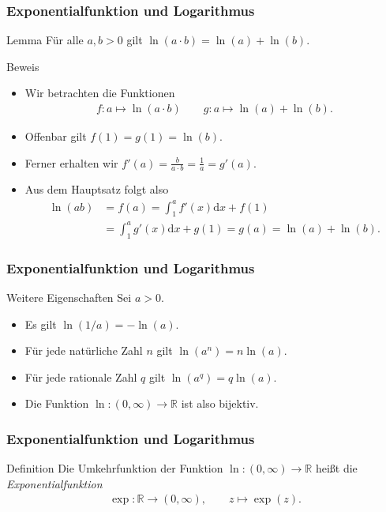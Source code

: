 \documentclass{beamer}
\renewcommand{\emph}[1]{{\textcolor{solarizedRed}{\itshape #1}}}
\newcommand\dd{\mathrm d}
\newcommand\RR{\mathbb R}
\newcommand{\ue}{\"u}
\newcommand{\mytitle}{Exponentialfunktion und Logarithmus}
\begin{document}
\begin{frame}\frametitle{\mytitle}
	\begin{block}{Lemma}
		F\ue r alle $a,b>0$ gilt $\ln(a\cdot b)=\ln(a)+\ln(b)$.
	\end{block}
	\begin{block}{Beweis}
	\begin{itemize}
	\item Wir betrachten die Funktionen
		\begin{align*}
			f:a\mapsto\ln(a\cdot b)\qquad g:a\mapsto\ln(a)+\ln(b).
		\end{align*}
	\item Offenbar gilt $f(1)=g(1)=\ln(b)$.
	\item Ferner erhalten wir $f'(a)=\frac{b}{a\cdot b}=\frac{1}{a}=g'(a).$
	\item Aus dem Hauptsatz folgt also
		\begin{align*}
			\ln(ab)&=f(a)=\int_1^af'(x)\dd x+f(1)\\&=\int_1^ag'(x)\dd x+g(1)=g(a)=\ln(a)+\ln(b).
		\end{align*}
	\end{itemize}
	\end{block}
\end{frame}

\begin{frame}\frametitle{\mytitle}
	\begin{block}{Weitere Eigenschaften}
		Sei $a>0$.
	\begin{itemize}
		\item Es gilt $\ln(1/a)=-\ln(a)$.
		\item F\ue r jede nat\ue rliche Zahl $n$ gilt $\ln(a^n)=n\ln(a)$.
		\item F\ue r jede rationale Zahl $q$ gilt $\ln(a^q)=q\ln(a)$.
		\item Die Funktion $\ln:(0,\infty)\to\RR$ ist also bijektiv.
	\end{itemize}
	\end{block}
\end{frame}

\begin{frame}\frametitle{\mytitle}
	\begin{block}{Definition}
		Die Umkehrfunktion der Funktion $\ln:(0,\infty)\to\RR$ hei\ss t die \emph{Exponentialfunktion}
		\begin{align*}
			\exp:\RR\to(0,\infty),\qquad z\mapsto\exp(z).
		\end{align*}
	\end{block}
\end{frame}
\end{document}

